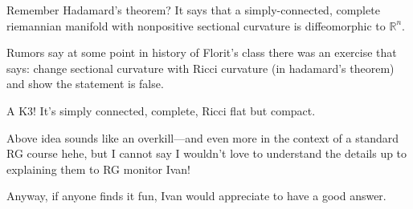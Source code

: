 \begin{exercise}\leavevmode
Remember Hadamard’s theorem? It says that a simply-connected, complete riemannian manifold with nonpositive sectional curvature is diffeomorphic to \(\mathbb{R}^n\).

Rumors say at some point in history of Florit’s class there was an exercise that says: change sectional curvature with Ricci curvature (in hadamard’s theorem) and show the statement is false.

A K3! It’s simply connected, complete, Ricci flat but compact.

Above idea sounds like an overkill—and even more in the context of a standard RG course hehe, but I cannot say I wouldn’t love to understand the details up to explaining them to RG monitor Ivan!

Anyway, if anyone finds it fun, Ivan would appreciate to have a good answer.
\end{exercise}
